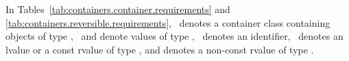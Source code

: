 \documentclass[american,twoside]{book}
\begin{document}
\pnum
{}


\setcounter{Paras}{4}
\pnum
In Tables~\ref{tab:containers.container.requirements} and
\ref{tab:containers.reversible.requirements}, \
denotes a container class containing objects of type
, \ and 
denote values of type , \
denotes an identifier, \ denotes
an lvalue or a const rvalue of type , and 
denotes a non-const rvalue of type .

\setcounter{table}{88}
\end{document}
